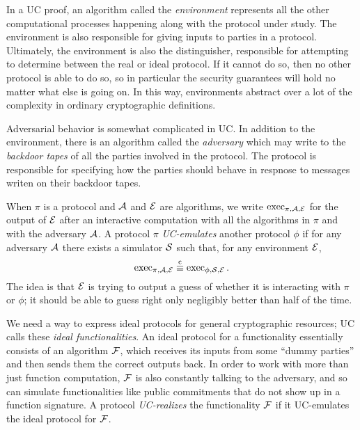 In a UC proof, an algorithm called the \emph{environment} represents all the
other computational processes happening along with the protocol under study. The
environment is also responsible for giving inputs to parties in a protocol.
Ultimately, the environment is also the distinguisher, responsible for
attempting to determine between the real or ideal protocol. If it cannot do so,
then no other protocol is able to do so, so in particular the security
guarantees will hold no matter what else is going on. In this way, environments
abstract over a lot of the complexity in ordinary cryptographic definitions.

Adversarial behavior is somewhat complicated in UC. In addition to the
environment, there is an algorithm called the \emph{adversary} which may write
to the \emph{backdoor tapes} of all the parties involved in the protocol. The
protocol is responsible for specifying how the parties should behave in respnose
to messages writen on their backdoor tapes.

When $\pi$ is a protocol and $\mathcal{A}$ and $\mathcal{E}$ are algorithms, we write
$\operatorname{exec}_{\pi,\mathcal{A},\mathcal{E}}$ for the output of $\mathcal{E}$ after an interactive computation
with all the algorithms in $\pi$ and with the adversary $\mathcal{A}$. A protocol $\pi$
\emph{UC-emulates} another protocol $\phi$ if for any adversary $\mathcal{A}$ there
exists a simulator $\mathcal{S}$ such that, for any environment $\mathcal{E}$, \[
  \operatorname{exec}_{\pi,\mathcal{A},\mathcal{E}}\overset{\text{c}}{\equiv} \operatorname{exec}_{\phi,\mathcal{S},\mathcal{E}}.
\]
The idea is that $\mathcal{E}$ is trying to output a guess of whether it is interacting
with $\pi$ or $\phi$; it should be able to guess right only negligibly better
than half of the time.

We need a way to express ideal protocols for general cryptographic resources; UC
calls these \emph{ideal functionalities}. An ideal protocol for a functionality
essentially consists of an algorithm $\mathcal{F}$, which receives its inputs from some
``dummy parties'' and then sends them the correct outputs back. In order to work
with more than just function computation, $\mathcal{F}$ is also constantly talking to
the adversary, and so can simulate functionalities like public commitments that
do not show up in a function signature. A protocol \emph{UC-realizes} the
functionality $\mathcal{F}$ if it UC-emulates the ideal protocol for $\mathcal{F}$.

